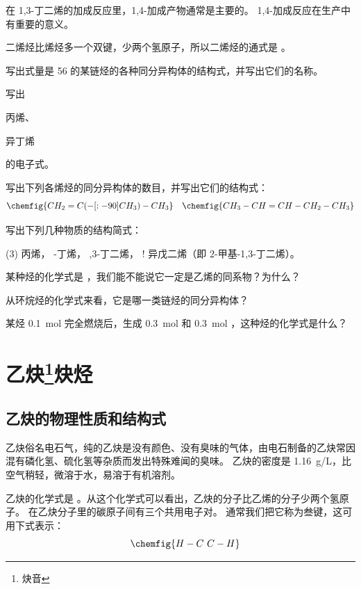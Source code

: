 在 1,3-丁二烯的加成反应里，1,4-加成产物通常是主要的。
1,4-加成反应在生产中有重要的意义。

二烯烃比烯烃多一个双键，少两个氢原子，所以二烯烃的通式是 。

\begin{Practice}
\begin{question}
  \item 写出式量是 56 的某链烃的各种同分异构体的结构式，并写出它们的名称。
  \item 写出\begin{enumerate*}\item 丙烯、\item 异丁烯\end{enumerate*}的电子式。
  \item 写出下列各烯烃的同分异构体的数目，并写出它们的结构式：
  \[\chemfig{CH_2=C(-[:-90]CH_3)-CH_3} \quad \chemfig{CH_3-CH=CH-CH_2-CH_3} \]
  \item 写出下列几种物质的结构简式：
  \begin{tasks}(3)
    \task  丙烯，
    -丁烯，
    ,3-丁二烯，
    \task! 异戊二烯（即 2-甲基-1,3-丁二烯）。
  \end{tasks}
  \item 某种烃的化学式是 ，我们能不能说它一定是乙烯的同系物？为什么？
  \item 从环烷烃的化学式来看，它是哪一类链烃的同分异构体？
  \item 某烃 \qty{0.1}{mol} 完全燃烧后，生成 \qty{0.3}{mol}  和 \qty{0.3}{mol} ，这种烃的化学式是什么？
\end{question}
\end{Practice}

\section[乙炔\ 炔烃]{乙炔\texorpdfstring{\protect\footnote{炔音}\quad}{ }炔烃}
\subsection{乙炔的物理性质和结构式}
乙炔俗名电石气，纯的乙炔是没有颜色、没有臭味的气体，由电石制备的乙炔常因混有磷化氢、硫化氢等杂质而发出特殊难闻的臭味。
乙炔的密度是 \qty{1.16}{g/L}，比空气稍轻，微溶于水，易溶于有机溶剂。

乙炔的化学式是 。从这个化学式可以看出，乙炔的分子比乙烯的分子少两个氢原子。
在乙炔分子里的碳原子间有三个共用电子对。
通常我们把它称为叁键，这可用下式表示：
\[ \quad \chemfig{H-C~C-H}\]

